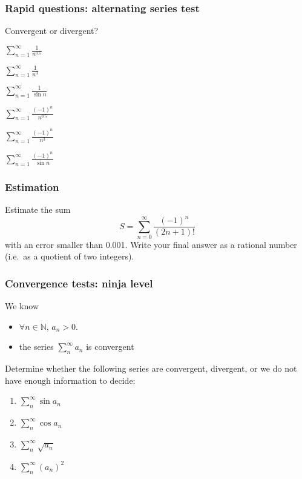 \documentclass[14pt]{beamer}
\newcommand{\N}{\mathbb{N}}
\newcommand{\vv}{\vspace{.5cm}}
\begin{document}
	\begin{frame}[t]
		\frametitle{Rapid questions: alternating series test}

		Convergent or divergent?

		\begin{enumerate}
		\end{enumerate}
	\end{frame}
	\begin{frame}[t]
		\frametitle{Estimation}

		Estimate the sum
		\[
			S = \sum_{n=0}^{\infty}\frac{(-1)^{n}}{(2n+1)!}
		\]
		with an error smaller than 0.001. Write your final answer as a rational number
		(i.e.\ as a quotient of two integers).
	\end{frame}
	\begin{frame}[t]
		\frametitle{Convergence tests: ninja level}

		We know
		\begin{itemize}
			\item ${\displaystyle \forall n \in \N}$, ${\displaystyle a_n > 0}$.

			\item the series ${\displaystyle \sum_n^{\infty} a_n }$ is convergent
		\end{itemize}

		Determine whether the following series are convergent, divergent, or we do not
		have enough information to decide:
		\begin{multicols}{2}
			\begin{enumerate}
				\item ${\displaystyle \sum_n^{\infty} \sin a_n}$

				\item ${\displaystyle \sum_n^{\infty} \cos a_n}$

				\item ${\displaystyle \sum_n^{\infty} \sqrt{a_{n}}}$

				\item ${\displaystyle \sum_n^{\infty} \left( a_n \right)^2}$
			\end{enumerate}
		\end{multicols}
	\end{frame}
\end{document}
